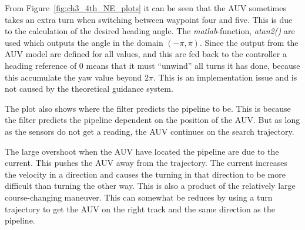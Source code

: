 		From Figure~\ref{fig:ch3_4th_NE_plots} it can be seen that the AUV sometimes takes an extra
		turn
		when switching between waypoint four and five. This is due to the calculation of the desired
		heading
		angle. The \textit{matlab}-function, \textit{atan2()} are used which outputs the angle in the
		domain $(-\pi, \pi)$. Since the output from the AUV model are defined for all values, and this
		are fed back to the controller a heading reference of 0 means that it must ``unwind'' all
		turns it has done, because this accumulate the yaw value beyond $2\pi$. This is an
		implementation issue and is not caused by the theoretical guidance system. 

		The plot also shows where the filter predicts the pipeline to be. This is because the filter predicts
		the pipeline dependent on the position of the AUV. But as long as the sensors do not get a reading, the
		AUV continues on the search trajectory.

		The large overshoot when the AUV have located the pipeline are due to the current. This
		pushes the AUV away from the trajectory. The current increases the velocity in a direction and
		causes the turning in that direction to be more difficult than turning the other way. This is also a
		product of the relatively large course-changing	maneuver. This can somewhat be reduces by using
		a turn trajectory to get the AUV on the right track and the same direction as the pipeline.
		
